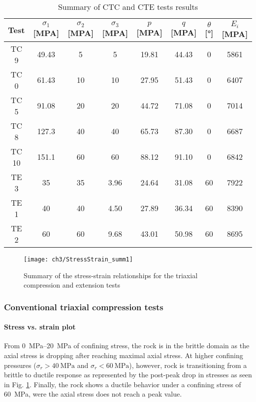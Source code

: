\begin{table}
    \centering
    \captionsetup{justification=centering}
    \caption{Summary of CTC and CTE tests results}
    \begin{tabular}{cccccccc}
        \hline 
        Test & $\sigma_1$ [\si{MPA}] & $\sigma_2$ [\si{MPA}] &$\sigma_3$ [\si{MPA}] & $p$ [\si{MPA}] & $q$ [\si{MPA}] & $\theta$ [\si{\degree}] & $E_i$ [\si{MPA}] \\
        \hline
        \hline
        TC 9  & 49.43 & 5  & 5    & 19.81 & 44.43 & 0  & 5861  \\ 
        TC 0  & 61.43 & 10 & 10   & 27.95 & 51.43 & 0  & 6407  \\ 
        TC 5  & 91.08 & 20 & 20   & 44.72 & 71.08 & 0  & 7014  \\ 
        TC 8  & 127.3 & 40 & 40   & 65.73 & 87.30 & 0  & 6687  \\ 
        TC 10 & 151.1 & 60 & 60   & 88.12 & 91.10 & 0  & 6842  \\ 
        \hline
        \hline
        TE 3  & 35    & 35 & 3.96 & 24.64 & 31.08 & 60 & 7922  \\ 
        TE 1  & 40    & 40 & 4.50 & 27.89 & 36.34 & 60 & 8390  \\ 
        TE 2  & 60    & 60 & 9.68 & 43.01 & 50.98 & 60 & 8695  \\
        \hline
    \end{tabular}
    \label{tb3:CTC-CTE-results}
\end{table}

\begin{figure}[p]
    \centering
    \texttt{[image: ch3/StressStrain\_summ1]}
    \caption{Summary of the stress-strain relationships for the triaxial compression and extension tests}
    \label{fig3:8}
\end{figure} 

\subsubsection{Conventional triaxial compression tests}

\paragraph{Stress vs. strain plot}
From \SIrange{0}{20}{MPa} of confining stress, the rock is in the brittle domain as the axial stress is dropping after reaching maximal axial stress. At higher confining pressures ($\sigma_r > \SI{40}{\mega\pascal}$ and $\sigma_r < \SI{60}{\mega\pascal}$), however, rock is transitioning from a brittle to ductile response as represented by the post-peak drop in stresses as seen in Fig. \ref{fig3:8}. Finally, the rock shows a ductile behavior under a confining stress of \SI{60}{MPa}, were the axial stress does not reach a peak value.

